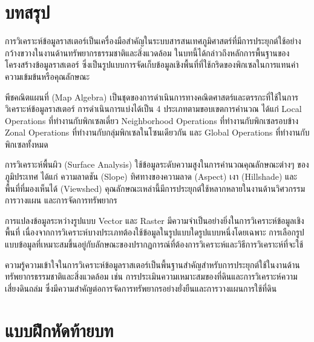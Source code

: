 \section{บทสรุป}

การวิเคราะห์ข้อมูลราสเตอร์เป็นเครื่องมือสำคัญในระบบสารสนเทศภูมิศาสตร์ที่มีการประยุกต์ใช้อย่างกว้างขวางในงานด้านทรัพยากรธรรมชาติและสิ่งแวดล้อม ในบทนี้ได้กล่าวถึงหลักการพื้นฐานของโครงสร้างข้อมูลราสเตอร์ ซึ่งเป็นรูปแบบการจัดเก็บข้อมูลเชิงพื้นที่ที่ใช้กริดของพิกเซลในการแทนค่าความเข้มข้นหรือคุณลักษณะ

พีชคณิตแผนที่ (Map Algebra) เป็นชุดของการดำเนินการทางคณิตศาสตร์และตรรกะที่ใช้ในการวิเคราะห์ข้อมูลราสเตอร์ การดำเนินการแบ่งได้เป็น 4 ประเภทตามขอบเขตการคำนวณ ได้แก่ Local Operations ที่ทำงานกับพิกเซลเดี่ยว Neighborhood Operations ที่ทำงานกับพิกเซลรอบข้าง Zonal Operations ที่ทำงานกับกลุ่มพิกเซลในโซนเดียวกัน และ Global Operations ที่ทำงานกับพิกเซลทั้งหมด

การวิเคราะห์พื้นผิว (Surface Analysis) ใช้ข้อมูลระดับความสูงในการคำนวณคุณลักษณะต่างๆ ของภูมิประเทศ ได้แก่ ความลาดชัน (Slope) ทิศทางของความลาด (Aspect) เงา (Hillshade) และพื้นที่ที่มองเห็นได้ (Viewshed) คุณลักษณะเหล่านี้มีการประยุกต์ใช้หลากหลายในงานด้านวิศวกรรม การวางแผน และการจัดการทรัพยากร

การแปลงข้อมูลระหว่างรูปแบบ Vector และ Raster มีความจำเป็นอย่างยิ่งในการวิเคราะห์ข้อมูลเชิงพื้นที่ เนื่องจากการวิเคราะห์บางประเภทต้องใช้ข้อมูลในรูปแบบใดรูปแบบหนึ่งโดยเฉพาะ การเลือกรูปแบบข้อมูลที่เหมาะสมขึ้นอยู่กับลักษณะของปรากฏการณ์ที่ต้องการวิเคราะห์และวิธีการวิเคราะห์ที่จะใช้

ความรู้ความเข้าใจในการวิเคราะห์ข้อมูลราสเตอร์เป็นพื้นฐานสำคัญสำหรับการประยุกต์ใช้ในงานด้านทรัพยากรธรรมชาติและสิ่งแวดล้อม เช่น การประเมินความเหมาะสมของที่ดินและการวิเคราะห์ความเสี่ยงดินถล่ม ซึ่งมีความสำคัญต่อการจัดการทรัพยากรอย่างยั่งยืนและการวางแผนการใช้ที่ดิน

\section{แบบฝึกหัดท้ายบท}

